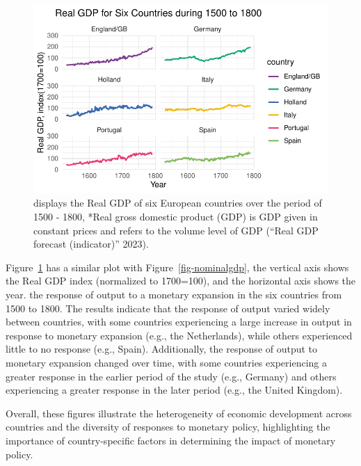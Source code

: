 \documentclass[
  letterpaper,
  DIV=11,
  numbers=noendperiod]{scrartcl}
\begin{document}
\begin{figure}

{\centering \includegraphics{paper_files/figure-pdf/fig-realgdp-1.pdf}

}

\caption{\label{fig-realgdp}displays the Real GDP of six European
countries over the period of 1500 - 1800, *Real gross domestic product
(GDP) is GDP given in constant prices and refers to the volume level of
GDP ({``{Real GDP forecast (indicator)}''} 2023).}

\end{figure}

Figure~\ref{fig-realgdp} has a similar plot with
Figure~\ref{fig-nominalgdp}, the vertical axis shows the Real GDP index
(normalized to 1700=100), and the horizontal axis shows the year. the
response of output to a monetary expansion in the six countries from
1500 to 1800. The results indicate that the response of output varied
widely between countries, with some countries experiencing a large
increase in output in response to monetary expansion (e.g., the
Netherlands), while others experienced little to no response (e.g.,
Spain). Additionally, the response of output to monetary expansion
changed over time, with some countries experiencing a greater response
in the earlier period of the study (e.g., Germany) and others
experiencing a greater response in the later period (e.g., the United
Kingdom).

Overall, these figures illustrate the heterogeneity of economic
development across countries and the diversity of responses to monetary
policy, highlighting the importance of country-specific factors in
determining the impact of monetary policy.
\end{document}
